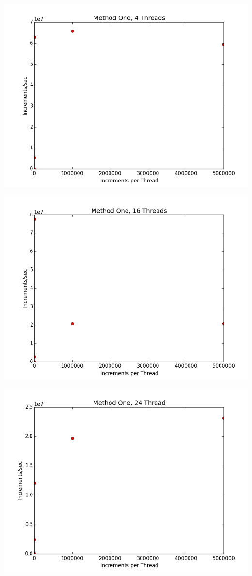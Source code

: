 \documentclass[12pt]{article}
\begin{document}
\includegraphics[scale=.5]{Graphs/MethodOne_4Thread.png}

\includegraphics[scale=.5]{Graphs/MethodOne_16Thread.png}

\includegraphics[scale=.5]{Graphs/MethodOne_24Thread.png}
\end{document}
